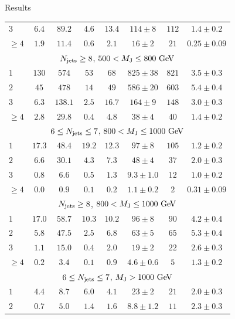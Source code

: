 \begin{section}{Results}
\begin{table}
\begin{tabular}[tbp!]{ l | c  c  c  c | c |  c | c  }
$3$      & $6.4$  & $89.2$  & $4.6$  & $13.4$ & $114\pm8$     & $112$  & $1.4 \pm 0.2$   \\
$\geq 4$ & $1.9$  & $11.4$  & $0.6$  & $2.1$  & $16\pm2$      & $21$   & $0.25 \pm 0.09$ \\
\hline
\multicolumn{8}{c}{$N_{\mathrm{jets}} \geq 8$, $500 < M_\mathrm{J} \leq 800~\mathrm{Ge\kern -0.1em V}$} \\
\hline
$1$      & $130$  & $574$   & $53$   & $68$   & $825\pm38$    & $821$  & $3.5 \pm 0.3$   \\
$2$      & $45$   & $478$   & $14$   & $49$   & $586\pm20$    & $603$  & $5.4 \pm 0.4$   \\
$3$      & $6.3$  & $138.1$ & $2.5$  & $16.7$ & $164\pm9$     & $148$  & $3.0 \pm 0.3$   \\
$\geq 4$ & $2.8$  & $29.8$  & $0.4$  & $4.8$  & $38\pm4$      & $40$   &  $1.4 \pm 0.2$  \\
\hline
\multicolumn{8}{c}{$6 \leq N_{\mathrm{jets}} \leq 7$, $800 < M_\mathrm{J} \leq 1000~\mathrm{Ge\kern -0.1em V}$} \\
\hline
$1$      & $17.3$ & $48.4$  & $19.2$ & $12.3$ & $97\pm8$      & $105$  & $1.2 \pm 0.2$   \\
$2$      & $6.6$  & $30.1$  & $4.3$  & $7.3$  & $48\pm4$      & $37$   & $2.0 \pm 0.3$   \\
$3$      & $0.8$  & $6.6$   & $0.5$  & $1.3$  & $9.3\pm1.0$   & $12$   & $1.0 \pm 0.2$   \\
$\geq 4$ & $0.0$  & $0.9$   & $0.1$  & $0.2$  & $1.1\pm0.2$   & $2$    & $0.31 \pm 0.09$ \\
\hline
\multicolumn{8}{c}{$N_{\mathrm{jets}} \geq 8$, $800 < M_\mathrm{J} \leq 1000~\mathrm{Ge\kern -0.1em V}$} \\
\hline
$1$      & $17.0$ & $58.7$  & $10.3$ & $10.2$ & $96\pm8$      & $90$   & $4.2 \pm 0.4$   \\
$2$      & $5.8$  & $47.5$  & $2.5$  & $6.8$  & $63\pm5$      & $65$   & $5.3 \pm 0.4$   \\
$3$      & $1.1$  & $15.0$  & $0.4$  & $2.0$  & $19\pm2$      & $22$   & $2.6 \pm 0.3$   \\
$\geq 4$ & $0.2$  & $3.4$   & $0.1$  & $0.9$  & $4.6\pm0.6$   & $5$    & $1.3 \pm 0.2$   \\
\hline
\multicolumn{8}{c}{$6 \leq N_{\mathrm{jets}} \leq 7$, $M_\mathrm{J} > 1000~\mathrm{Ge\kern -0.1em V}$} \\
\hline
$1$      & $4.4$  & $8.7$   & $6.0$  & $4.1$  & $23\pm2$      & $21$   & $2.0 \pm 0.3$   \\
$2$      & $0.7$  & $5.0$   & $1.4$  & $1.6$  & $8.8\pm1.2$   & $11$   & $2.3 \pm 0.3$   \\

\end{tabular}
\end{table}
\end{section}
